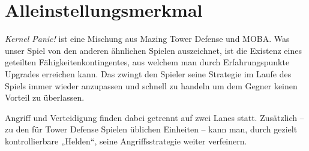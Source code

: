 \section{Alleinstellungsmerkmal}


\textit{Kernel Panic!} ist eine Mischung aus Mazing Tower Defense und MOBA.
Was unser Spiel von den anderen ähnlichen Spielen auszeichnet, ist die Existenz
eines geteilten Fähigkeitenkontingentes, aus welchem man durch Erfahrungspunkte Upgrades erreichen kann. Das zwingt den Spieler seine Strategie im Laufe des Spiels immer wieder anzupassen und schnell zu handeln um dem Gegner keinen Vorteil zu überlassen.

Angriff und Verteidigung finden dabei getrennt auf zwei Lanes statt.
Zusätzlich -- zu den für Tower Defense Spielen üblichen Einheiten -- kann man, durch gezielt kontrollierbare „Helden“, seine Angriffsstrategie weiter verfeinern.
